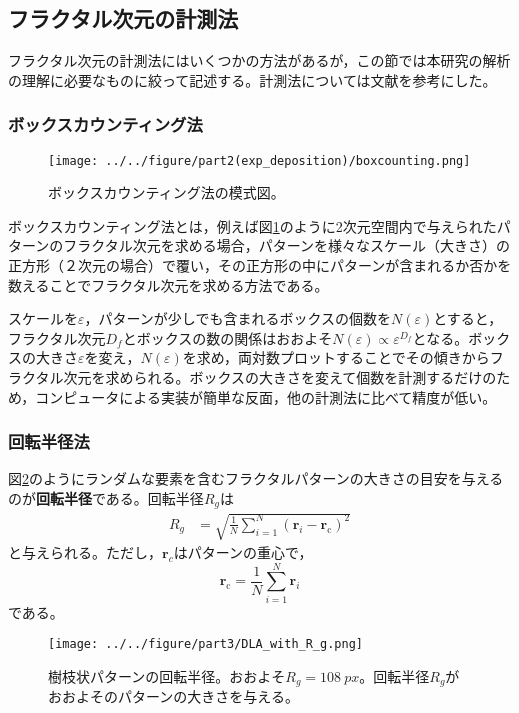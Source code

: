 \documentclass[autodetect-engine,dvi=dvipdfmx,a4paper,ja=standard,oneside,openany,11pt]{bxjsbook}
\begin{document}
\subsection{フラクタル次元の計測法}
フラクタル次元の計測法にはいくつかの方法があるが，この節では本研究の解析の理解に必要なものに絞って記述する。計測法については文献\cite{フラクタルの物理Ⅰ}を参考にした。
\subsubsection{ボックスカウンティング法}
\begin{figure}[htbp]
  \centering
  \texttt{[image: ../../figure/part2(exp\_deposition)/boxcounting.png]}
  \caption{ボックスカウンティング法の模式図\cite{表面粗さ曲線のフラクタル解析}。}
  \label{fig:box_counting}
\end{figure}

ボックスカウンティング法とは，例えば図\ref{fig:box_counting}のように2次元空間内で与えられたパターンのフラクタル次元を求める場合，パターンを様々なスケール（大きさ）の正方形（２次元の場合）で覆い，その正方形の中にパターンが含まれるか否かを数えることでフラクタル次元を求める方法である。

スケールを$\varepsilon$，パターンが少しでも含まれるボックスの個数を$N(\varepsilon)$とすると，フラクタル次元$D_f$とボックスの数の関係はおおよそ$N(\varepsilon)\propto\varepsilon^{D_f}$となる。ボックスの大きさ$\varepsilon$を変え，$N(\varepsilon)$を求め，両対数プロットすることでその傾きからフラクタル次元を求められる。ボックスの大きさを変えて個数を計測するだけのため，コンピュータによる実装が簡単な反面，他の計測法に比べて精度が低い。
\subsubsection{回転半径法}
図\ref{fig:DLA_with_R_g}のようにランダムな要素を含むフラクタルパターンの大きさの目安を与えるのが\textbf{回転半径}である。回転半径$R_g$は
\begin{align}
  R_g & =\sqrt{\frac{1}{N}\sum_{i=1}^{N}(\bm{r}_i-\bm{r}_{\mathrm{c}})^2}
  \label{eq:gyration_radius}
\end{align}
と与えられる。ただし，$\bm{r}_c$はパターンの重心で，
\begin{equation}
  \bm{r}_{\mathrm{c}}=\frac{1}{N}\sum_{i=1}^{N}\bm{r}_i
\end{equation}
である。

\begin{figure}[htbp]
  \centering
  \texttt{[image: ../../figure/part3/DLA\_with\_R\_g.png]}
  \caption{樹枝状パターンの回転半径。おおよそ$R_g=\SI{108}{px}$。回転半径$R_g$がおおよそのパターンの大きさを与える。}
  \label{fig:DLA_with_R_g}
\end{figure}
\end{document}
